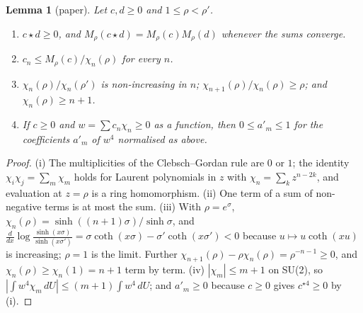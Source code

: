 \documentclass[11pt,a4paper]{article}
\newtheorem{lemma}[theorem]{Lemma}
\theoremstyle{definition}
\theoremstyle{remark}
\begin{document}
\begin{lemma}[paper]\label{lem:cg}
Let $c,d\ge0$ and $1\le\rho<\rho'$.
\begin{enumerate}[label=(\roman*),nosep]
\item $c\star d\ge0$, and $M_\rho(c\star d)=M_\rho(c)M_\rho(d)$ whenever the sums converge.
\item $c_n\le M_\rho(c)/\chi_n(\rho)$ for every $n$.
\item $\chi_n(\rho)/\chi_n(\rho')$ is non-increasing in $n$; $\chi_{n+1}(\rho)/\chi_n(\rho)\ge\rho$; and $\chi_n(\rho)\ge n+1$.
\item If $c\ge0$ and $w=\sum c_n\chi_n\ge0$ as a function, then $0\le a'_m\le1$ for the coefficients $a'_m$ of $w^4$ normalised as above.
\end{enumerate}
\end{lemma}
\begin{proof}
(i) The multiplicities of the Clebsch--Gordan rule are $0$ or $1$; the identity $\chi_i\chi_j=\sum_{m}\chi_m$ holds for Laurent polynomials in $z$ with $\chi_n=\sum_kz^{n-2k}$, and evaluation at $z=\rho$ is a ring homomorphism.
(ii) One term of a sum of non-negative terms is at most the sum.
(iii) With $\rho=e^{\sigma}$, $\chi_n(\rho)=\sinh((n+1)\sigma)/\sinh\sigma$, and $\frac{d}{dx}\log\frac{\sinh(x\sigma)}{\sinh(x\sigma')}=\sigma\coth(x\sigma)-\sigma'\coth(x\sigma')<0$ because $u\mapsto u\coth(xu)$ is increasing; $\rho=1$ is the limit.
Further $\chi_{n+1}(\rho)-\rho\chi_n(\rho)=\rho^{-n-1}\ge0$, and $\chi_n(\rho)\ge\chi_n(1)=n+1$ term by term.
(iv) $|\chi_m|\le m+1$ on SU(2), so $|\int w^4\chi_m\,dU|\le(m+1)\int w^4\,dU$; and $a'_m\ge0$ because $c\ge0$ gives $c^{\star4}\ge0$ by (i).
\end{proof}
\end{document}

